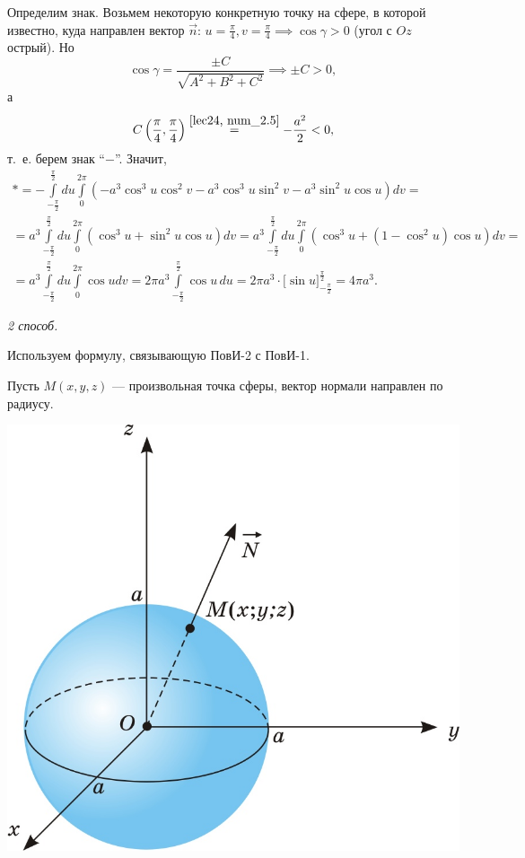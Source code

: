 \documentclass[../../main.tex]{subfiles}
\begin{document}
\begin{example}
	Определим знак. Возьмем некоторую конкретную точку на сфере, в которой 
	известно, куда направлен вектор $\vec{n}$: $u=\frac{\pi}{4}, v=\frac{\pi}{4}
	\implies \cos\gamma > 0$ (угол с $Oz$ острый). Но \[\cos\gamma = 
	\dfrac{\pm C}{\sqrt{A^2 + B^2 + C^2}}\implies \pm C>0,\] а \[C\left(\frac{\pi}
	{4}, \frac{\pi}{4}\right)\stk{lec24, num_2.5}{=}-\frac{a^2}{2}<0,\] т.~е. берем
	 знак ``$-$''. Значит,
	\begin{gather*}*=-\int\limits_{-\frac{\pi}{2}}^{\frac{\pi}{2}}du\int
	\limits_0^{2\pi}(-a^3\cos^3 u \cos^2 v - a^3\cos^3 u \sin^2 v - a^3\sin^2
	 u \cos u)dv =\\= a^3 \int\limits_{-\frac{\pi}{2}}^{\frac{\pi}{2}}du\int
	 \limits_0^{2\pi}(\cos^3 u + \sin^2 u \cos u)dv = a^3 \int\limits_{-\frac
	 	{\pi}{2}}^{\frac{\pi}{2}}du\int\limits_0^{2\pi}(\cos^3 u + (1-\cos^2 u)
 	 \cos u)dv = \\ = a^3 \int\limits_{-\frac{\pi}{2}}^{\frac{\pi}{2}}du\int
 	 \limits_0^{2\pi}\cos u dv =
 	 2\pi a^3 \int\limits_{-\frac{\pi}{2}}^{\frac{\pi}{2}}\cos u\,du
 	 = 2\pi a^3 \cdot\Big[\sin u\Big]_{-\frac\pi2}^{\frac\pi2}
 	 = 4\pi a^3.
 	 \end{gather*}
	
	\noindent\emph{2 способ.}
	
	Используем формулу, связывающую ПовИ-2 с ПовИ-1.
		
	Пусть $M(x, y, z)$ --- произвольная точка сферы, вектор нормали направлен 
	по радиусу.
	
	\begin{center}
		\includegraphics[scale = 0.27]{lec24_1.jpg}
	\end{center}
	

\end{example}
\end{document}
